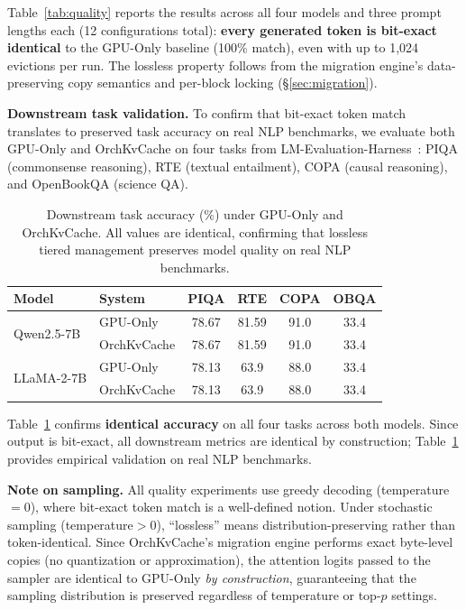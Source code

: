 \documentclass[conference]{IEEEtran}
\begin{document}
Table~\ref{tab:quality} reports the results across all four models and three prompt lengths each (12 configurations total): \textbf{every generated token is bit-exact identical} to the GPU-Only baseline (100\% match), even with up to 1,024 evictions per run. The lossless property follows from the migration engine's data-preserving copy semantics and per-block locking (\S\ref{sec:migration}).

\textbf{Downstream task validation.} To confirm that bit-exact token match translates to preserved task accuracy on real NLP benchmarks, we evaluate both GPU-Only and OrchKvCache on four tasks from LM-Evaluation-Harness~\cite{lm-eval}: PIQA (commonsense reasoning), RTE (textual entailment), COPA (causal reasoning), and OpenBookQA (science QA).

\begin{table}[t]
\centering
\caption{Downstream task accuracy (\%) under GPU-Only and OrchKvCache. All values are identical, confirming that lossless tiered management preserves model quality on real NLP benchmarks.}
\label{tab:lm-eval}
\small
\begin{tabular}{@{}llcccc@{}}
\toprule
Model & System & PIQA & RTE & COPA & OBQA \\
\midrule
\multirow{2}{*}{Qwen2.5-7B}
& GPU-Only    & 78.67 & 81.59 & 91.0 & 33.4 \\
& OrchKvCache & 78.67 & 81.59 & 91.0 & 33.4 \\
\midrule
\multirow{2}{*}{LLaMA-2-7B}
& GPU-Only    & 78.13 & 63.9 & 88.0 & 33.4 \\
& OrchKvCache & 78.13 & 63.9 & 88.0 & 33.4 \\
\bottomrule
\end{tabular}
\end{table}

Table~\ref{tab:lm-eval} confirms \textbf{identical accuracy} on all four tasks across both models. Since output is bit-exact, all downstream metrics are identical by construction; Table~\ref{tab:lm-eval} provides empirical validation on real NLP benchmarks.

\textbf{Note on sampling.} All quality experiments use greedy decoding (temperature$=$0), where bit-exact token match is a well-defined notion. Under stochastic sampling (temperature$>$0), ``lossless'' means distribution-preserving rather than token-identical. Since OrchKvCache's migration engine performs exact byte-level copies (no quantization or approximation), the attention logits passed to the sampler are identical to GPU-Only \emph{by construction}, guaranteeing that the sampling distribution is preserved regardless of temperature or top-$p$ settings.
\end{document}
